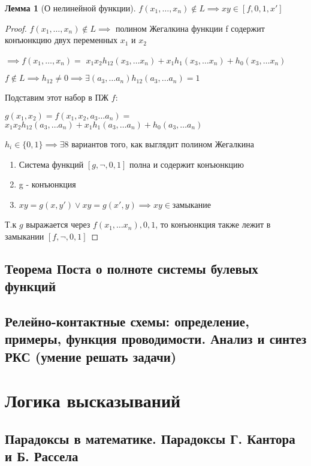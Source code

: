 \documentclass[a4paper]{article}
\newtheorem{lemma}{Лемма}[section]
\theoremstyle{definition}
\theoremstyle{remark}
\begin{document}
    \begin{lemma}[О нелинейной функции]
        $f(x_1, \dots, x_n) \notin L \implies xy \in [f, 0, 1, x']$
    \end{lemma}
    \begin{proof}
        $f(x_1, \dots, x_n) \notin L\implies$ полином Жегалкина функции f содержит конъюнкцию двух переменных $x_1$ и $x_2$
    
        $\implies f(x_1, \dots, x_n)=$
        $x_1x_2h_{12}(x_3, \dots x_n) + x_1h_1(x_3, \dots x_n) + h_0(x_3, \dots x_n)$
        
        $f\notin L \implies h_{12}\neq 0 \implies \exists (a_3, \dots a_n) h_{12} (a_3, \dots a_n) = 1$

        Подставим этот набор в ПЖ $f$:

        $g(x_1, x_2) = f(x_1, x_2, a_3\dots  a_n) = $
        $x_1x_2h_{12}(a_3, \dots a_n) + x_1h_1(a_3, \dots a_n) + h_0(a_3, \dots a_n)$

        $h_i\in \{0, 1\}\implies \exists 8$ вариантов того, как выглядит полином Жегалкина

        \begin{enumerate}
            \item Система функций $[g, \neg, 0, 1]$ полна и содержит конъюнкцию
            \item g - конъюнкция
            \item $xy = g(x, y') \vee xy = g(x', y)\implies xy \in $замыкание
        \end{enumerate}
        Т.к $g$ выражается через $f(x_1, \dots x_n), 0, 1$, то конъюнкция также лежит в замыкании $[f, \neg, 0, 1]$

    \end{proof}
    \subsection{Теорема Поста о полноте системы булевых функций}
    \subsection{Релейно-контактные схемы: определение, примеры, функция проводимости. Анализ и синтез РКС (умение решать задачи)}
    \section{Логика высказываний}
    \subsection{Парадоксы в математике. Парадоксы Г. Кантора и  Б. Рассела}
\end{document}
